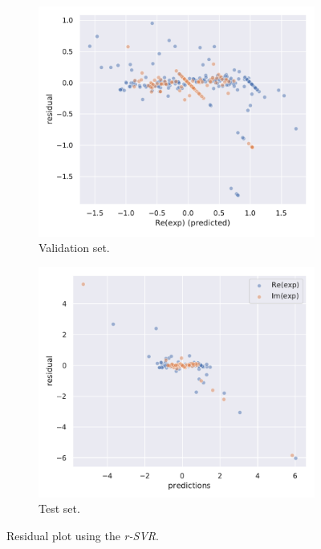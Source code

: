 \begin{figure}[htbp]
  \centering
  \begin{subfigure}{0.45\textwidth}
    \centering
    \includegraphics[width=\linewidth]{img/svr_val_res_plot}
    \caption{Validation set.}
  \end{subfigure}
  \begin{subfigure}{0.45\textwidth}
    \centering
    \includegraphics[width=\linewidth]{img/svr_test_res_plot}
    \caption{Test set.}
  \end{subfigure}
  \caption{Residual plot using the \emph{r-SVR}.}
  \label{fig:agg:svr_res_plot}
\end{figure}


